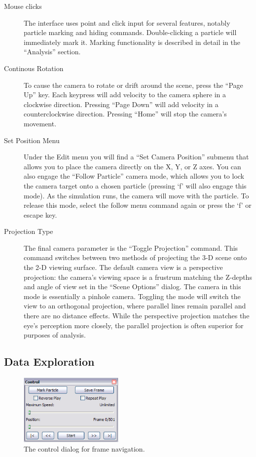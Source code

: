 \begin{description}
\item[Mouse clicks]
	The interface uses point and click input for several features, notably particle marking and hiding commands.  Double-clicking a particle will immediately mark it.  Marking functionality is described in detail in the ``Analysis'' section.

\item[Continous Rotation]
	To cause the camera to rotate or drift around the scene, press the ``Page Up'' key.  Each keypress will add velocity to the camera sphere in a clockwise direction.  Pressing ``Page Down'' will add velocity in a counterclockwise direction.  Pressing ``Home'' will stop the camera's movement.

\item[Set Position Menu] 
	Under the Edit menu you will find a ``Set Camera Position'' submenu that allows you to place the camera directly on the X, Y, or Z axes.  You can also engage the ``Follow Particle'' camera mode, which allows you to lock the camera target onto a chosen particle (pressing `f' will also engage this mode).  As the simulation runs, the camera will move with the particle.  To release this mode, select the follow menu command again or press the `f' or escape key.
	
\item[Projection Type]
	The final camera parameter is the ``Toggle Projection'' command.  This command switches between two methods of projecting the 3-D scene onto the 2-D viewing surface.  The default camera view is a perspective projection: the camera's viewing space is a frustrum matching the Z-depths and angle of view set in the ``Scene Options'' dialog.  The camera in this mode is essentially a pinhole camera.  Toggling the mode will switch the view to an orthogonal projection, where parallel lines remain parallel and there are no distance effects.  While the perspective projection matches the eye's perception more closely, the parallel projection is often superior for purposes of analysis.
\end{description}

\subsection{Data Exploration}

\begin{figure}[htb]
	\centering
	\includegraphics[width=2in]{figures/control-dialog.png}
	\caption[The control dialog for frame navigation]{The control dialog for frame navigation.}
	\label{control-dialog}
\end{figure}

